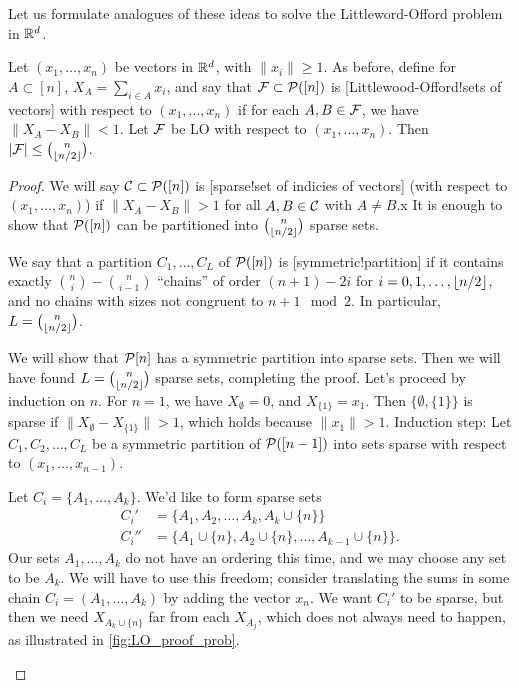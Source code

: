 Let us formulate analogues of these ideas to solve the Littleword-Offord problem in $\R^d$.
\begin{theorem} \label{thm:kleit70}
Let $(x_1,\dotsc,x_n)$ be vectors in $\R^d$, with $\|x_i\| \geq 1$. As before, define for $A\subset [n]$, $X_A = \sum_{i\in A} x_i$, and say that $\F\subset \P([n])$ is [Littlewood-Offord!sets of vectors] with respect to $(x_1,\dotsc,x_n)$ if for each $A,B\in \F$, we have $\|X_A - X_B\| < 1$.
Let $\F$ be LO with respect to $(x_1,\dotsc,x_n)$. Then $|\F| \leq { n\choose \floor{n/2}}$.
\end{theorem}
\begin{proof}	
We will say $\Cset\subset \P([n])$ is [sparse!set of indicies of vectors] (with respect to $(x_1,\dotsc,x_n)$) if $\|X_A-X_B\| > 1$ for all $A,B\in \Cset$ with $A\neq B$.x
It is enough to show that $\P([n])$ can be partitioned into ${n\choose \floor{n/2}}$ sparse sets. 

We say that a partition $C_1,\dotsc,C_L$ of $\P([n])$ is [symmetric!partition] if it contains exactly ${n\choose i} - {n\choose i-1}$ ``chains'' of order $(n+1)-2i$ for $i=0,1,\dotsc,\floor{n/2}$, and no chains with sizes not congruent to $n+1 \mod 2$.   In particular, $L= {n\choose \floor{n/2}}$.

We will show that $\P[n]$ has a symmetric partition into sparse sets. Then we will have found $L = {n\choose \floor{n/2}}$ sparse sets, completing the proof.
Let's proceed by induction on $n$. For $n=1$, we have $X_\emptyset = 0$, and $X_{\{1\}} = x_1$. Then $\{\emptyset, \{1\}\}$ is sparse if $\|X_\emptyset - X_{\{1\}}\| > 1$, which holds because $\|x_1\| > 1$.
Induction step: Let $C_1,C_2,\dotsc, C_L$ be a symmetric partition of $\P([n-1])$ into sets sparse with respect to $(x_1,\dotsc,x_{n-1})$. 

Let $C_i = \{A_1,\dotsc,A_k\}$. We'd like to form sparse sets
\begin{align*}	
C_i' &= \{A_1,A_2,\dotsc,A_k,A_k \cup \{n\}\}\\
C_i'' &= \{A_1\cup \{n\}, A_2\cup\{n\},\dotsc,A_{k-1}\cup \{n\}\}.
\end{align*}
Our sets $A_1,\dotsc,A_k$ do not have an ordering this time, and we may choose any set to be $A_k$. We will have to use this freedom; consider translating the sums in some chain $C_i = (A_1,\dotsc,A_k)$ by adding the vector $x_n$. We want $C_i'$ to be sparse, but then we need $X_{A_k\cup\{n\}}$ far from each $X_{A_j}$, which does not always need to happen, as illustrated in \cref{fig:LO_proof_prob}.
\begin{marginfigure}[-3cm]



\end{marginfigure}
\end{proof}
